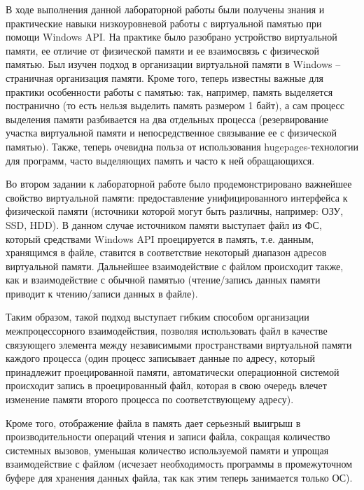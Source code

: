 \documentclass[a4paper,14pt]{extarticle}
\begin{document}

\clearpage


В ходе выполнения данной лабораторной работы были получены знания и практические навыки
низкоуровневой работы с виртуальной памятью при помощи Windows API. На практике
было разобрано устройство виртуальной памяти, ее отличие от физической памяти
и ее взаимосвязь с физической памятью. Был изучен подход в организации
виртуальной памяти в Windows -- страничная организация памяти. Кроме того,
теперь известны важные для практики особенности работы с памятью: так, например,
память выделяется постранично (то есть нельзя выделить память размером 1 байт),
а сам процесс выделения памяти разбивается на два отдельных процесса
(резервирование участка виртуальной памяти и непосредственное связывание ее с
физической памятью). Также, теперь очевидна польза от использования
hugepages-технологии для программ, часто выделяющих память и часто к ней
обращающихся.

Во втором задании к лабораторной работе было продемонстрировано важнейшее
свойство виртуальной памяти: предоставление унифицированного интерфейса к
физической памяти (источники которой могут быть различны, например: ОЗУ, SSD,
HDD). В данном случае источником памяти выступает файл из ФС, который
средствами Windows API проецируется в память, т.е. данным, хранящимся в файле,
ставится в соответствие некоторый диапазон адресов виртуальной памяти.
Дальнейшее взаимодействие с файлом происходит также, как и взаимодействие с
обычной памятью (чтение/запись данных памяти приводит к чтению/записи данных в
файле).

Таким образом, такой подход выступает гибким способом организации
межпроцессорного взаимодействия, позволяя использовать файл в качестве
связующего элемента между независимыми пространствами виртуальной памяти
каждого процесса (один процесс записывает данные по адресу, который принадлежит
проецированной памяти, автоматически операционной системой происходит запись в
проецированный файл, которая в свою очередь влечет изменение памяти второго
процесса по соответствующему адресу).

Кроме того, отображение файла в память дает серьезный выигрыш в
производительности операций чтения и записи файла, сокращая количество
системных вызовов, уменьшая количество используемой памяти и упрощая
взаимодействие с файлом (исчезает необходимость программы в промежуточном
буфере для хранения данных файла, так как этим теперь занимается только ОС).
\end{document}
